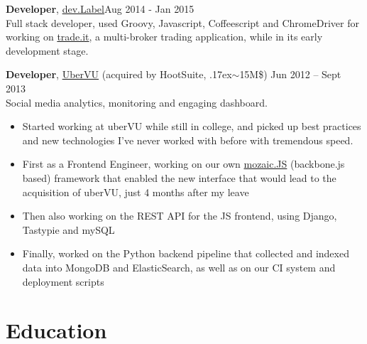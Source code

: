 \documentclass[line, margin]{resume}
\newcommand{\bettertilde}{\raise.17ex\hbox{$\scriptstyle\mathtt{\sim}$}}
\begin{document}
\begin{resume}
\textbf{Developer}, \href{http://devlabel.com/}{dev.Label}\hfill Aug 2014 - Jan 2015\\
Full stack developer, used Groovy, Javascript, Coffeescript and ChromeDriver for working on \href{https://www.trade.it/}{trade.it}, a multi-broker trading application, while in its early development stage.

\textbf{Developer}, \href{http://ubervu.com}{UberVU} (acquired by HootSuite, \bettertilde15M\$) \hfill Jun 2012 -- Sept 2013\\
Social media analytics, monitoring and engaging dashboard.
\begin{itemize} \itemsep -2pt  %
	\item Started working at uberVU while still in college, and picked up best practices and new technologies I've never worked with before with tremendous speed.
	\item First as a Frontend Engineer, working on our own \href{https://github.com/uberVU/mozaic/}{mozaic.JS} (backbone.js based) framework that enabled the new interface that would lead to the acquisition of uberVU, just 4 months after my leave
    \item Then also working on the REST API for the JS frontend, using Django, Tastypie and mySQL
    \item Finally, worked on the Python backend pipeline that collected and indexed data into MongoDB and ElasticSearch, as well as on our CI system and deployment scripts
\end{itemize}



    \section{Education}



\end{resume}
\end{document}
